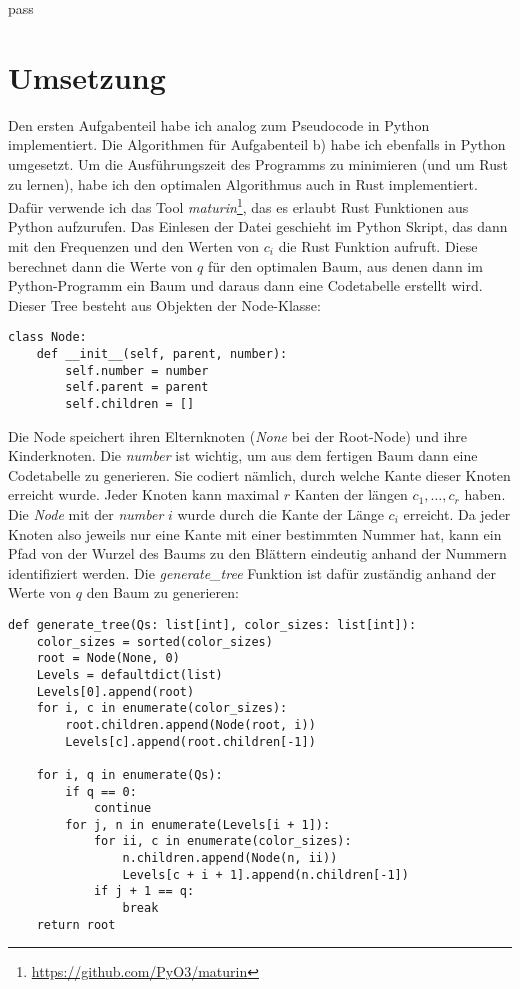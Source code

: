 pass\documentclass[a4paper,10pt,ngerman]{scrartcl}
\begin{document}
    \section{Umsetzung}
    Den ersten Aufgabenteil habe ich analog zum Pseudocode in Python implementiert.
    Die Algorithmen für Aufgabenteil b) habe ich ebenfalls in Python umgesetzt.
    Um die Ausführungszeit des Programms zu minimieren (und um Rust zu lernen), habe ich den optimalen Algorithmus auch in Rust implementiert.
    Dafür verwende ich das Tool \textit{maturin}\footnote{\url{https://github.com/PyO3/maturin}}, das es erlaubt Rust Funktionen aus Python aufzurufen.
    Das Einlesen der Datei geschieht im Python Skript, das dann mit den Frequenzen und den Werten von $c_i$ die Rust Funktion aufruft.
    Diese berechnet dann die Werte von $q$ für den optimalen Baum, aus denen dann im Python-Programm ein Baum und daraus dann eine Codetabelle erstellt wird.
    Dieser Tree besteht aus Objekten der Node-Klasse:
    \begin{verbatim}
class Node:
    def __init__(self, parent, number):
        self.number = number
        self.parent = parent
        self.children = []
    \end{verbatim}%
    Die Node speichert ihren Elternknoten (\textit{None} bei der Root-Node) und ihre Kinderknoten.
    Die \textit{number} ist wichtig, um aus dem fertigen Baum dann eine Codetabelle zu generieren.
    Sie codiert nämlich, durch welche Kante dieser Knoten erreicht wurde.
    Jeder Knoten kann maximal $r$ Kanten der längen $c_1, \dots, c_r$ haben.
    Die \textit{Node} mit der \textit{number} $i$ wurde durch die Kante der Länge $c_i$ erreicht.
    Da jeder Knoten also jeweils nur eine Kante mit einer bestimmten Nummer hat, kann ein Pfad von der Wurzel des Baums zu den Blättern eindeutig anhand der Nummern identifiziert werden.
    Die \textit{generate\_tree} Funktion ist dafür zuständig anhand der Werte von $q$ den Baum zu generieren:
    \begin{verbatim}
def generate_tree(Qs: list[int], color_sizes: list[int]):
    color_sizes = sorted(color_sizes)
    root = Node(None, 0)
    Levels = defaultdict(list)
    Levels[0].append(root)
    for i, c in enumerate(color_sizes):
        root.children.append(Node(root, i))
        Levels[c].append(root.children[-1])

    for i, q in enumerate(Qs):
        if q == 0:
            continue
        for j, n in enumerate(Levels[i + 1]):
            for ii, c in enumerate(color_sizes):
                n.children.append(Node(n, ii))
                Levels[c + i + 1].append(n.children[-1])
            if j + 1 == q:
                break
    return root
    \end{verbatim}%
\end{document}
